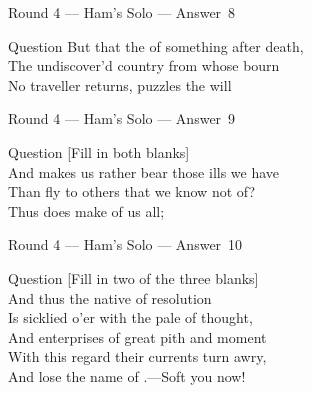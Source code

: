 \documentclass[11pt]{beamer}
\begin{document}
\begin{frame}[t]{Round 4 --- Ham's Solo --- \mbox{Answer 8}}
\vspace{-0.5em}
\begin{block}{Question}
But that the \textunderscore{}\textunderscore{}\textunderscore{}\textunderscore{}\textunderscore{} of something after death,\\
The undiscover'd country from whose bourn\\
No traveller returns, puzzles the will
\end{block}
\end{frame}
\begin{frame}[t]{Round 4 --- Ham's Solo --- \mbox{Answer 9}}
\vspace{-0.5em}
\begin{block}{Question}
[Fill in both blanks]\\
And makes us rather bear those ills we have\\
Than fly to others that we know not of?\\
Thus \textunderscore{}\textunderscore{}\textunderscore{}\textunderscore{}\textunderscore{} does make \textunderscore{}\textunderscore{}\textunderscore{}\textunderscore{}\textunderscore{} of us all;
\end{block}
\end{frame}
\begin{frame}[t]{Round 4 --- Ham's Solo --- \mbox{Answer 10}}
\vspace{-0.5em}
\begin{block}{Question}
[Fill in two of the three blanks]\\
And thus the native \textunderscore{}\textunderscore{}\textunderscore{}\textunderscore{}\textunderscore{} of resolution\\
Is sicklied o'er with the pale \textunderscore{}\textunderscore{}\textunderscore{}\textunderscore{}\textunderscore{} of thought,\\
And enterprises of great pith and moment\\
With this regard their currents turn awry,\\
And lose the name of \textunderscore{}\textunderscore{}\textunderscore{}\textunderscore{}\textunderscore{}.---Soft you now!
\end{block}
\end{frame}
\def\thisSectionName{Philosophy and Philosophers}
\end{document}
